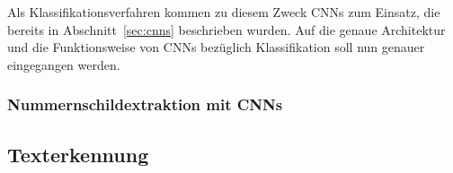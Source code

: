 Als Klassifikationsverfahren kommen zu diesem Zweck CNNs zum Einsatz,
die bereits in Abschnitt~\ref{sec:cnns} beschrieben wurden.
Auf die genaue Architektur und die Funktionsweise von CNNs bez\"uglich
Klassifikation soll nun genauer eingegangen werden.

\subsubsection{Nummernschildextraktion mit CNNs}

\subsection{Texterkennung}
\label{sec:texterkennung}